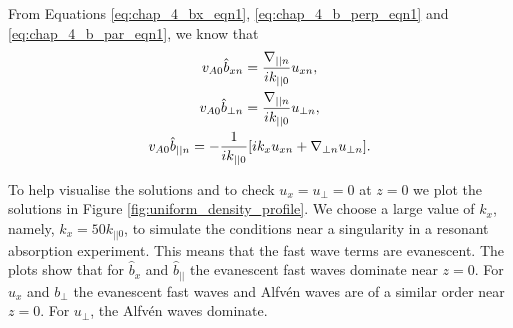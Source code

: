From Equations \eqref{eq:chap_4_bx_eqn1}, \eqref{eq:chap_4_b_perp_eqn1} and \eqref{eq:chap_4_b_par_eqn1}, we know that
\begin{gather}
    \label{eq:bxn_oblique_field_uniform_density}
    v_{A0}\hat{b}_{xn} = \frac{\nabla_{||n}}{ik_{||0}}u_{xn}, \\
    \label{eq:b_perp_n_oblique_field_uniform_density}
    v_{A0}\hat{b}_{\perp n} = \frac{\nabla_{||n}}{ik_{||0}}u_{\perp n}, \\
    \label{eq:chap_4_uniform_density_b_par0}
    v_{A0}\hat{b}_{|| n} = -\frac{1}{ik_{||0}}\qty[ik_x u_{xn}+\nabla_{\perp n} u_{\perp n}].
\end{gather}

To help visualise the solutions and to check $u_x=u_\perp=0$ at $z=0$ we plot the solutions in Figure \ref{fig:uniform_density_profile}. We choose a large value of $k_x$, namely, $k_x = 50k_{||0}$, to simulate the conditions near a singularity in a resonant absorption experiment. This means that the fast wave terms are evanescent. The plots show that for $\hat{b}_x$ and $\hat{b}_{||}$ the evanescent fast waves dominate near $z=0$. For $u_x$ and $b_{\perp}$ the evanescent fast waves and Alfv\'en waves are of a similar order near $z=0$. For $u_\perp$, the Alfv\'en waves dominate.

